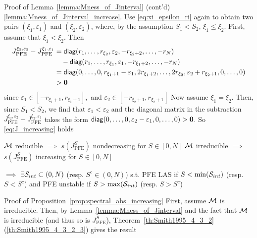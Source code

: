\documentclass[aspectratio=169]{beamer}
\begin{document}
\begin{frame}{Proof of Lemma~\ref{lemma:Mness_of_Jinterval} (cont'd)}
	\ref{lemma:Mness_of_Jinterval_increase}. Use \eqref{eq:xi_epsilon_ri} again to obtain two pairs $(\xi_1,\varepsilon_1)$ and $(\xi_2,\varepsilon_2)$, where, by the assumption $S_1<S_2$, $\xi_1\leq\xi_2$. First, assume that $\xi_1<\xi_2$. Then
	\begin{align*}
	J_{\textrm{PFE}}^{\xi_2,\varepsilon_2}-J_{\textrm{PFE}}^{\xi_1,\varepsilon_1} 
	&= \diag(r_1,\ldots,r_{\xi_2},\varepsilon_2,-r_{\xi_2+2},\ldots,-r_N) \\
	&\quad -
	\diag(r_1,\ldots,r_{\xi_1},\varepsilon_1,-r_{\xi_1+2},\ldots,-r_N) \\
	&= \diag(0,\ldots,0,r_{\xi_1+1}-\varepsilon_1,
	2r_{\xi_1+2},
	\ldots,
	2r_{\xi_2},\varepsilon_2+r_{\xi_2+1},0,\ldots,0) \\
	&>\b0
	\end{align*}
	since $\varepsilon_1 \in[-r_{\xi_1+1},r_{\xi_1+1}],$ and $\varepsilon_2\in[-r_{\xi_2+1},r_{\xi_2+1}]$
	\vfill
	Now assume $\xi_1=\xi_2$. Then, since $S_1<S_2$, we find that $\varepsilon_1<\varepsilon_2$ and the diagonal matrix in the subtraction $J_{\textrm{PFE}}^{\xi_2,\varepsilon_2}-J_{\textrm{PFE}}^{\xi_2,\varepsilon_1}$ takes the form $\diag(0,\ldots,0,\varepsilon_2-\varepsilon_1,0,\ldots,0)>\b0$. So \eqref{eq:J_increasing} holds
\end{frame}


\begin{frame}
	\begin{proposition}\label{prop:spectral_abs_increasing}
		$\M$ reducible $\implies$ $s(J_{\textrm{PFE}}^S)$ nondecreasing for $S\in[0,N]$
		\vskip0.2cm
		$\M$ irreducible $\implies$ $s(J_{\textrm{PFE}}^S)$ increasing for $S\in[0,N]$
	\end{proposition}
	\vfill
	$\implies$ $\exists \S_{int}\subset(0,N)$ (resp. $S^c\in(0,N)$) s.t. PFE LAS if $S<\min(\S_{int})$ (resp. $S<S^c$) and PFE unstable if $S>\max(\S_{int})$ (resp. $S>S^c$)
\end{frame}

\begin{frame}{Proof of Proposition~\ref{prop:spectral_abs_increasing}}
	First, assume $\M$ is irreducible. Then, by Lemma~\ref{lemma:Mness_of_Jinterval} and the fact that $\M$ is irreducible (and thus so is $J_{\textrm{PFE}}^S$), Theorem~\ref{th:Smith1995_4_3_2}(\ref{th:Smith1995_4_3_2_3}) gives the result
\end{frame}
\end{document}
